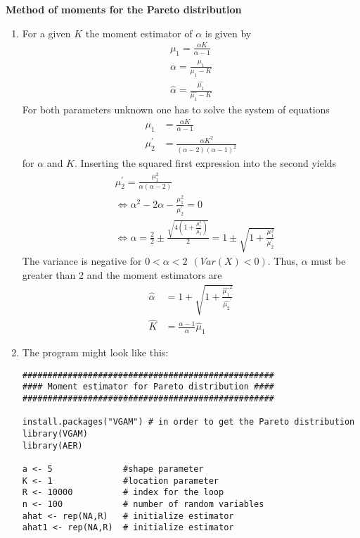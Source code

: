 \begin{Solution}{11.5}
\textbf{Method of moments for the Pareto distribution}

\begin{enumerate}
  \item For a given $K$ the moment estimator of $\alpha$ is given by
      \begin{align*}
        \mu_1 = \frac{\alpha K}{\alpha - 1}\\
        \alpha = \frac{\mu_1}{\mu_1-K}\\
        \hat{\alpha} = \frac{\hat{\mu_1}}{\hat{\mu_1}-K}
      \end{align*}
      For both parameters unknown one has to solve the system of
      equations
      \begin{align*}
        \mu_1 &= \frac{\alpha K}{\alpha - 1}\\
        \mu_{2}^{\prime} &= \frac{\alpha K^2}{(\alpha-2)(\alpha-1)^2}
      \end{align*}
      for $\alpha$ and $K$. Inserting the squared first expression into
      the second yields
      \begin{align*}
        &\mu_{2}^{\prime} = \frac{\mu_1^2}{\alpha(\alpha-2)}\\
        &\Leftrightarrow\alpha^2-2\alpha-\frac{\mu_1^2}{\mu_{2}^{\prime}}=0\\
        &\Leftrightarrow\alpha = \frac{2}{2} \pm \frac{\sqrt{4(1+\frac{\mu_1^2}{\mu_{2}^{\prime}})}}{2}=1\pm \sqrt{1+\frac{\mu_1^2}{\mu_{2}^{\prime}}}
      \end{align*}
      The variance is negative for $0<\alpha<2~~ (Var(X)<0)$. Thus,
      $\alpha$ must be greater than 2 and the moment estimators are
      \begin{align*}
        \hat{\alpha} &= 1 + \sqrt{1+\frac{\hat{\mu_1}^2}{\hat{\mu_{2}}^{\prime}}}\\
        \hat{K} &= \frac{\alpha-1}{\alpha}\hat{\mu}_1
      \end{align*}
  \item The program might look like this:

\begin{verbatim}
##################################################
#### Moment estimator for Pareto distribution ####
##################################################

install.packages("VGAM") # in order to get the Pareto distribution
library(VGAM)
library(AER)

a <- 5              #shape parameter
K <- 1              #location parameter
R <- 10000          # index for the loop
n <- 100            # number of random variables
ahat <- rep(NA,R)   # initialize estimator
ahat1 <- rep(NA,R)  # initialize estimator


\end{verbatim}
\end{enumerate}
\end{Solution}
